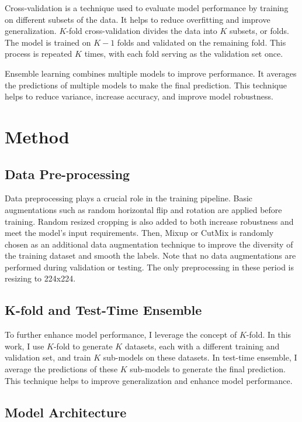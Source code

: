 \documentclass[10pt,twocolumn,letterpaper]{article}
\begin{document}
Cross-validation is a technique used to evaluate model performance by training
on different subsets of the data. It helps to reduce overfitting and improve
generalization. $K$-fold cross-validation divides the data into $K$ subsets, or
folds. The model is trained on $K-1$ folds and validated on the remaining fold.
This process is repeated $K$ times, with each fold serving as the validation set
once.

Ensemble learning combines multiple models to improve performance. It averages
the predictions of multiple models to make the final prediction. This technique
helps to reduce variance, increase accuracy, and improve model robustness.

\section{Method}
\label{sec:method}

\subsection{Data Pre-processing}

Data preprocessing plays a crucial role in the training pipeline. Basic
augmentations such as random horizontal flip and rotation are applied
before training. Random resized cropping is also added to both increase robustness
and meet the model's input requirements. Then, Mixup or CutMix is randomly chosen
as an additional data augmentation technique to improve the diversity of the training
dataset and smooth the labels. Note that no data augmentations are performed during
validation or testing. The only preprocessing in these period is
resizing to 224x224.

\subsection{K-fold and Test-Time Ensemble}

To further enhance model performance, I leverage the concept of $K$-fold. In
this work, I use $K$-fold to generate $K$ datasets, each with a different training
and validation set, and train $K$ sub-models on these datasets. In test-time ensemble,
I average the predictions of these $K$ sub-models to generate the final prediction. This
technique helps to improve generalization and enhance model performance.

\subsection{Model Architecture}
\end{document}
